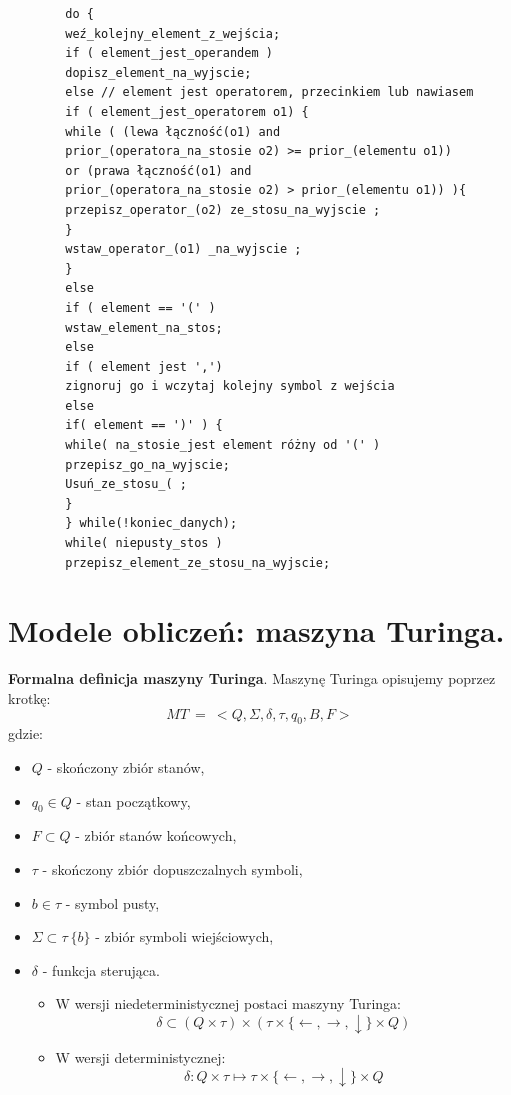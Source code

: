 \documentclass[12pt]{article}
\begin{document}
    \begin{verbatim}
        do {
        weź_kolejny_element_z_wejścia;
        if ( element_jest_operandem )
        dopisz_element_na_wyjscie;
        else // element jest operatorem, przecinkiem lub nawiasem
        if ( element_jest_operatorem o1) {
        while ( (lewa łączność(o1) and
        prior_(operatora_na_stosie o2) >= prior_(elementu o1))
        or (prawa łączność(o1) and
        prior_(operatora_na_stosie o2) > prior_(elementu o1)) ){
        przepisz_operator_(o2) ze_stosu_na_wyjscie ;
        }
        wstaw_operator_(o1) _na_wyjscie ;
        }
        else
        if ( element == '(' )
        wstaw_element_na_stos;
        else
        if ( element jest ',')
        zignoruj go i wczytaj kolejny symbol z wejścia
        else
        if( element == ')' ) {
        while( na_stosie_jest element różny od '(' )
        przepisz_go_na_wyjscie;
        Usuń_ze_stosu_( ;
        }
        } while(!koniec_danych);
        while( niepusty_stos )
        przepisz_element_ze_stosu_na_wyjscie;
    \end{verbatim}

    \newpage

    \section{Modele obliczeń: maszyna Turinga.}

    \begin{definition}
        \textbf{Formalna definicja maszyny Turinga}. Maszynę Turinga opisujemy poprzez krotkę:
        \[MT ~ = ~<Q, \Sigma, \delta, \tau, q_0, B, F >\]
        gdzie:
        \begin{itemize}
            \item $Q$ - skończony zbiór stanów,
            \item $q_0 \in Q$ - stan początkowy,
            \item $F \subset Q$ - zbiór stanów końcowych,
            \item $\tau$  - skończony zbiór dopuszczalnych symboli,
            \item $b \in \tau$  - symbol pusty,
            \item $\Sigma \subset \tau \ \{b\} $ - zbiór symboli wiejściowych,
            \item $\delta$ - funkcja sterująca.
            \begin{itemize}
                \item W wersji niedeterministycznej postaci maszyny Turinga:
                \[ \delta \subset (Q \times \tau)  \times (\tau \times \{\leftarrow, \rightarrow, \downarrow\}  \times Q)\]
                \item W wersji deterministycznej:
                \[ \delta : Q \times \tau \mapsto \tau \times \{\leftarrow, \rightarrow, \downarrow\} \times Q\]
            \end{itemize}
        \end{itemize}
    \end{definition}
\end{document}
